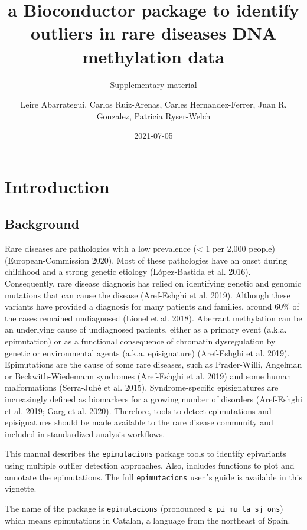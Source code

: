 \documentclass[
]{article}
\title{a Bioconductor package to identify outliers in rare diseases DNA
methylation data}
\subtitle{Supplementary material}
\author{Leire Abarrategui, Carlos Ruiz-Arenas, Carles Hernandez-Ferrer, Juan R.
Gonzalez, Patricia Ryser-Welch}
\date{2021-07-05}
\begin{document}
\maketitle

\hypertarget{introduction}{%
\section{Introduction}\label{introduction}}

\hypertarget{background}{%
\subsection{Background}\label{background}}

Rare diseases are pathologies with a low prevalence (\textless{} 1 per
2,000 people) (European-Commission 2020). Most of these pathologies have
an onset during childhood and a strong genetic etiology (López-Bastida
et al. 2016). Consequently, rare disease diagnosis has relied on
identifying genetic and genomic mutations that can cause the disease
(Aref-Eshghi et al. 2019). Although these variants have provided a
diagnosis for many patients and families, around 60\% of the cases
remained undiagnosed (Lionel et al. 2018). Aberrant methylation can be
an underlying cause of undiagnosed patients, either as a primary event
(a.k.a. epimutation) or as a functional consequence of chromatin
dysregulation by genetic or environmental agents (a.k.a. episignature)
(Aref-Eshghi et al. 2019). Epimutations are the cause of some rare
diseases, such as Prader-Willi, Angelman or Beckwith-Wiedemann syndromes
(Aref-Eshghi et al. 2019) and some human malformations (Serra-Juhé et
al. 2015). Syndrome-specific episignatures are increasingly defined as
biomarkers for a growing number of disorders (Aref-Eshghi et al. 2019;
Garg et al. 2020). Therefore, tools to detect epimutations and
episignatures should be made available to the rare disease community and
included in standardized analysis workflows.

This manual describes the \texttt{epimutacions} package tools to
identify epivariants using multiple outlier detection approaches. Also,
includes functions to plot and annotate the epimutations. The full
\texttt{epimutacions} user´s guide is available in this vignette.

The name of the package is \texttt{epimutacions} (pronounced
\texttt{ɛ\ pi\ mu\ ta\ \textquotesingle{}sj\ ons}) which means
epimutations in Catalan, a language from the northeast of Spain.
\end{document}
